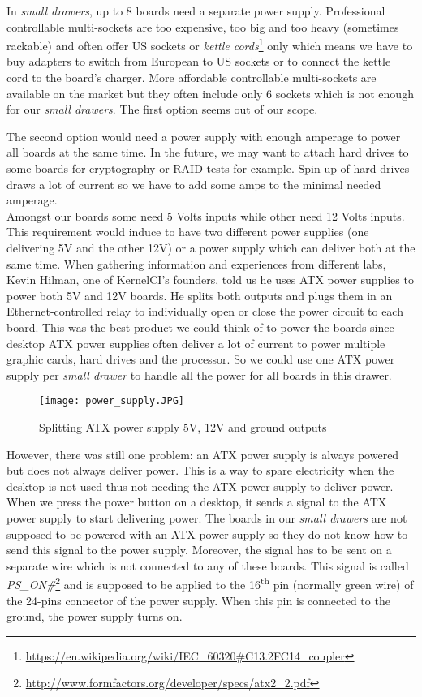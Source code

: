 In \textit{small drawers}, up to 8 boards need a separate power supply. Professional controllable multi-sockets are too expensive, too big and too heavy (sometimes rackable) and often offer US sockets or \textit{kettle cords}\footnote{\url{https://en.wikipedia.org/wiki/IEC\_60320\#C13.2FC14\_coupler}} only which means we have to buy adapters to switch from European to US sockets or to connect the kettle cord to the board's charger. More affordable controllable multi-sockets are available on the market but they often include only 6 sockets which is not enough for our \textit{small drawers}. The first option seems out of our scope.

The second option would need a power supply with enough amperage to power all boards at the same time. In the future, we may want to attach hard drives to some boards for cryptography or RAID tests for example. Spin-up of hard drives draws a lot of current so we have to add some amps to the minimal needed amperage.\\
Amongst our boards some need 5 Volts inputs while other need 12 Volts inputs. This requirement would induce to have two different power supplies (one delivering 5V and the other 12V) or a power supply which can deliver both at the same time. When gathering information and experiences from different labs, Kevin Hilman, one of KernelCI's founders, told us he uses ATX power supplies to power both 5V and 12V boards. He splits both outputs and plugs them in an Ethernet-controlled relay to individually open or close the power circuit to each board. This was the best product we could think of to power the boards since desktop ATX power supplies often deliver a lot of current to power multiple graphic cards, hard drives and the processor. So we could use one ATX power supply per \textit{small drawer} to handle all the power for all boards in this drawer.

\begin{figure}[H]
  \texttt{[image: power\_supply.JPG]}
  \caption{Splitting ATX power supply 5V, 12V and ground outputs}
\end{figure}

However, there was still one problem: an ATX power supply is always powered but does not always deliver power. This is a way to spare electricity when the desktop is not used thus not needing the ATX power supply to deliver power. When we press the power button on a desktop, it sends a signal to the ATX power supply to start delivering power. The boards in our \textit{small drawers} are not supposed to be powered with an ATX power supply so they do not know how to send this signal to the power supply. Moreover, the signal has to be sent on a separate wire which is not connected to any of these boards. This signal is called \textit{PS\_ON\#}\footnote{\url{http://www.formfactors.org/developer/specs/atx2\_2.pdf}} and is supposed to be applied to the 16\textsuperscript{th} pin (normally green wire) of the 24-pins connector of the power supply. When this pin is connected to the ground, the power supply turns on.

